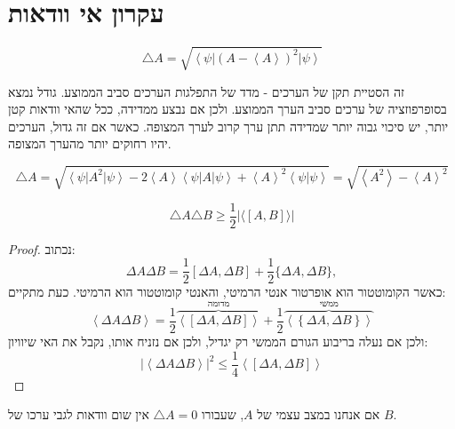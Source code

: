 \documentclass{tstextbook}
\begin{document}
\section{עקרון אי וודאות}

\begin{definition}
$$\triangle A = \sqrt{\left\langle\psi\right|\left(A-\left\langle A\right\rangle\right)^{2}\left|\psi\right\rangle}$$

\end{definition}
\begin{remark}
זה הסטיית תקן של הערכים - מדד של התפלגות הערכים סביב הממוצע. גודל נמצא בסופרפוזציה של ערכים סביב הערך הממוצע. ולכן אם נבצע ממדידה, ככל שהאי וודאות קטן יותר, יש סיכוי גבוה יותר שמדידה תתן ערך קרוב לערך המצופה. כאשר אם זה גדול, הערכים יהיו רחוקים יותר מהערך המצופה.

\end{remark}
\begin{proposition}
$$\triangle A=\sqrt{\left\langle\psi\right|A^{2}\left|\psi\right\rangle-2\left\langle A\right\rangle\left\langle\psi\right|A\left|\psi\right\rangle+\left\langle A\right\rangle^{2}\left\langle\psi|\psi\right\rangle}=\sqrt{\left\langle A^{2}\right\rangle-\left\langle A\right\rangle^{2}}$$

\end{proposition}
\begin{theorem}[אי הוודאות]
$$\triangle A \triangle B \geq \frac{1}{2}\left\lvert  \langle [A,B] \rangle   \right\rvert $$

\end{theorem}
\begin{proof}
נכתוב:
$$\Delta A\Delta B={\frac{1}{2}}[\Delta A,\Delta B]+{\frac{1}{2}}\{\Delta A,\Delta B\},$$
כאשר הקומוטטור הוא אופרטור אנטי הרמיטי, והאנטי קומוטטור הוא הרמיטי. כעת מתקיים:
$$\left\langle \Delta A\Delta B \right\rangle=\frac{1}{2}\overbrace{ \left\langle  \left[ \Delta A,\Delta B \right]  \right\rangle }^{ \text{מדומה} } +\frac{1}{2}\overbrace{ \left\langle \left\{ \Delta A,\Delta B \right\} \right\rangle }^{ \text{ממשי} }$$
ולכן אם נעלה בריבוע הגורם הממשי רק יגדיל, ולכן אם נזניח אותו, נקבל את האי שיוויון:
$$\left\lvert  \left\langle  \Delta A\Delta B  \right\rangle   \right\rvert ^2 \leq \frac{1}{4}\left\langle  \left[ \Delta A,\Delta B \right]  \right\rangle $$

\end{proof}
\begin{remark}
אם אנחנו במצב עצמי של \(A\), שעבורו \(\triangle A = 0\) אין שום וודאות לגבי ערכו של \(B\).

\end{remark}
\end{document}
